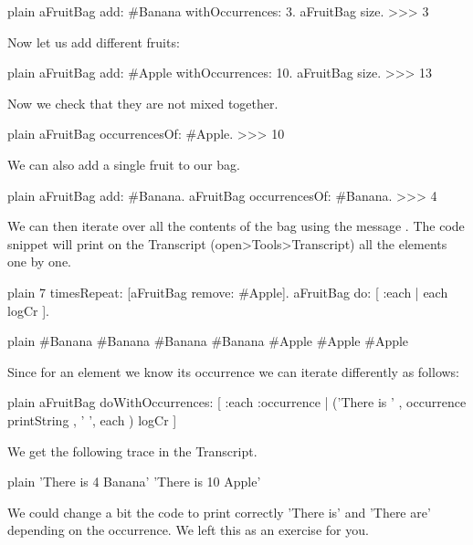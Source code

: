 \documentclass[10pt,twoside,english]{_support/latex/sbabook/sbabook}
\begin{document}
\begin{displaycode}{plain}
aFruitBag add: #Banana withOccurrences: 3.
aFruitBag size.
>>> 3
\end{displaycode}

Now let us add different fruits:

\begin{displaycode}{plain}
aFruitBag add: #Apple withOccurrences: 10. 
aFruitBag size.
>>> 13
\end{displaycode}

Now we check that they are not mixed together. 

\begin{displaycode}{plain}
aFruitBag occurrencesOf: #Apple.
>>> 10
\end{displaycode}

We can also add a single fruit to our bag.

\begin{displaycode}{plain}
aFruitBag add: #Banana.
aFruitBag occurrencesOf: #Banana.
>>> 4
\end{displaycode}

We can then iterate over all the contents of the bag using the message .
The code snippet will print on the Transcript (open\textgreater{}Tools\textgreater{}Transcript) all the elements one by one. 

\begin{displaycode}{plain}
7 timesRepeat: [aFruitBag remove: #Apple].
aFruitBag do: [ :each |  each logCr ].
\end{displaycode}

\begin{displaycode}{plain}
#Banana
#Banana
#Banana
#Banana
#Apple
#Apple
#Apple
\end{displaycode}

Since for an element we know its occurrence we can iterate differently as follows:

\begin{displaycode}{plain}
aFruitBag doWithOccurrences: [ :each :occurrence | ('There is ' ,  occurrence printString , ' ', each ) logCr ]
\end{displaycode}

We get the following trace in the Transcript. 

\begin{displaycode}{plain}
'There is 4 Banana'
'There is 10 Apple'
\end{displaycode}

We could change a bit the code to print correctly 'There is' and 'There are' depending on the occurrence. We left this as an exercise for you.
\end{document}
